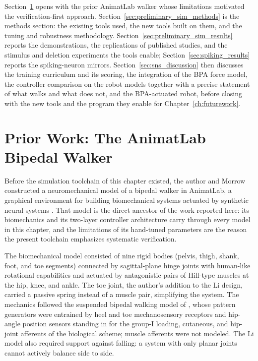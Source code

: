 Section~\ref{sec:prior_walker} opens with the prior AnimatLab walker whose limitations motivated the verification-first approach. Section~\ref{sec:preliminary_sim_methods} is the methods section: the existing tools used, the new tools built on them, and the tuning and robustness methodology. Section~\ref{sec:preliminary_sim_results} reports the demonstrations, the replications of published studies, and the stimulus and deletion experiments the tools enable; Section~\ref{sec:spiking_results} reports the spiking-neuron mirrors. Section~\ref{sec:sns_discussion} then discusses the training curriculum and its scoring, the integration of the BPA force model, the controller comparison on the robot models together with a precise statement of what walks and what does not, and the BPA-actuated robot, before closing with the new tools and the program they enable for Chapter~\ref{ch:futurework}.

\section{Prior Work: The AnimatLab Bipedal Walker}\label{sec:prior_walker}

Before the simulation toolchain of this chapter existed, the author and Morrow constructed a neuromechanical model of a bipedal walker in AnimatLab, a graphical environment for building biomechanical systems actuated by synthetic neural systems \citep{cofer_animatlab_2010}. That model is the direct ancestor of the work reported here: its biomechanics and its two-layer controller architecture carry through every model in this chapter, and the limitations of its hand-tuned parameters are the reason the present toolchain emphasizes systematic verification.

The biomechanical model consisted of nine rigid bodies (pelvis, thigh, shank, foot, and toe segments) connected by sagittal-plane hinge joints with human-like rotational capabilities and actuated by antagonistic pairs of Hill-type muscles at the hip, knee, and ankle. The toe joint, the author's addition to the Li design, carried a passive spring instead of a muscle pair, simplifying the system. The mechanics followed the suspended bipedal walking model of \citet{li_bipedal_2017}, whose pattern generators were entrained by heel and toe mechanosensory receptors and hip-angle position sensors standing in for the group-I loading, cutaneous, and hip-joint afferents of the biological scheme; muscle afferents were not modeled. The Li model also required support against falling: a system with only planar joints cannot actively balance side to side.

